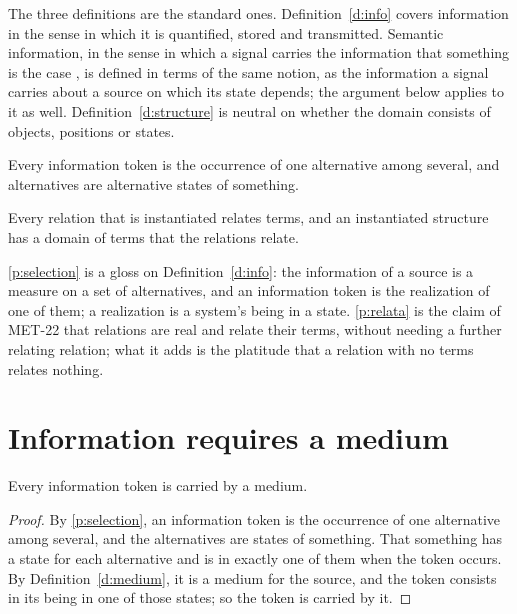 \documentclass{situationist-preprint}
\begin{document}
The three definitions are the standard ones. Definition~\ref{d:info} covers information in the sense in which it is quantified, stored and transmitted. Semantic information, in the sense in which a signal carries the information that something is the case \citep{Dretske1981}, is defined in terms of the same notion, as the information a signal carries about a source on which its state depends; the argument below applies to it as well. Definition~\ref{d:structure} is neutral on whether the domain consists of objects, positions or states.

\begin{principle}[Selection]\label{p:selection}
Every information token is the occurrence of one alternative among several, and alternatives are alternative states of something.
\end{principle}

\begin{principle}[Relata]\label{p:relata}
Every relation that is instantiated relates terms, and an instantiated structure has a domain of terms that the relations relate.
\end{principle}

\ref{p:selection} is a gloss on Definition~\ref{d:info}: the information of a source is a measure on a set of alternatives, and an information token is the realization of one of them; a realization is a system's being in a state. \ref{p:relata} is the claim of MET-22 that relations are real and relate their terms, without needing a further relating relation; what it adds is the platitude that a relation with no terms relates nothing.

\section{Information requires a medium}\label{s:medium}

\begin{proposition}\label{p:medium}
Every information token is carried by a medium.
\end{proposition}

\begin{proof}
By \ref{p:selection}, an information token is the occurrence of one alternative among several, and the alternatives are states of something. That something has a state for each alternative and is in exactly one of them when the token occurs. By Definition~\ref{d:medium}, it is a medium for the source, and the token consists in its being in one of those states; so the token is carried by it.
\end{proof}
\end{document}
